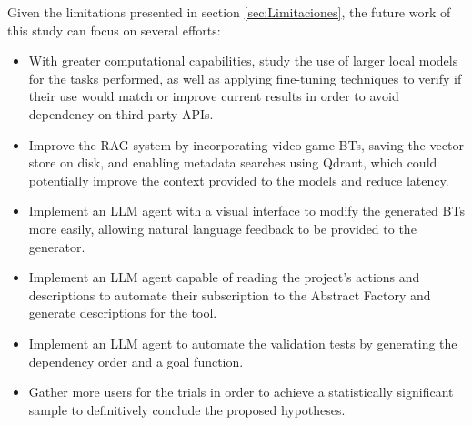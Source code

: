Given the limitations presented in section \ref{sec:Limitaciones}, the future work of this study can focus on several efforts:

\begin{itemize}
    \item With greater computational capabilities, study the use of larger local models for the tasks performed, as well as applying fine-tuning techniques to verify if their use would match or improve current results in order to avoid dependency on third-party APIs.
    \item Improve the RAG system by incorporating video game BTs, saving the vector store on disk, and enabling metadata searches using Qdrant, which could potentially improve the context provided to the models and reduce latency.
    \item Implement an LLM agent with a visual interface to modify the generated BTs more easily, allowing natural language feedback to be provided to the generator.
    \item Implement an LLM agent capable of reading the project's actions and descriptions to automate their subscription to the Abstract Factory and generate descriptions for the tool.
    \item Implement an LLM agent to automate the validation tests by generating the dependency order and a goal function.
    \item Gather more users for the trials in order to achieve a statistically significant sample to definitively conclude the proposed hypotheses.
\end{itemize}


